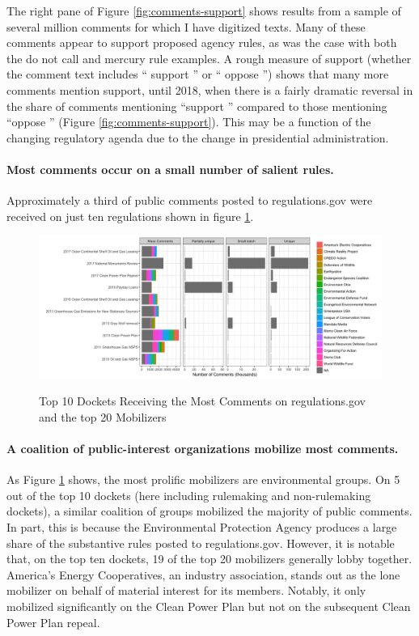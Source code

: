 The right pane of Figure \ref{fig:comments-support} shows results from a sample of several million comments for which I have digitized texts. Many of these comments appear to support proposed agency rules, as was the case with both the do not call and mercury rule examples. A rough measure of support (whether the comment text includes `` support '' or `` oppose '') shows that many more comments mention support, until 2018, when there is a fairly dramatic reversal in the share of comments mentioning ``support '' compared to those mentioning ``oppose '' (Figure \ref{fig:comments-support}). This may be a function of the changing regulatory agenda due to the change in presidential administration. 



\paragraph{Most comments occur on a small number of salient rules.} Approximately a third of public comments posted to regulations.gov were received on just ten regulations shown in figure \ref{fig:topdockets}.


\begin{figure}[h!]
    \centering
        \caption{Top 10 Dockets Receiving the Most Comments on regulations.gov and the top 20 Mobilizers}
    \includegraphics[width = 6in]{Figs/topdockets.png}
    \label{fig:topdockets}
\end{figure}


\paragraph{A coalition of public-interest organizations mobilize most comments.} As Figure \ref{fig:topdockets} %
shows, the most prolific mobilizers are environmental groups. On 5 out of the top 10 dockets (here including rulemaking and non-rulemaking dockets), a similar coalition of groups mobilized the majority of public comments. In part, this is because the Environmental Protection Agency produces a large share of the substantive rules posted to regulations.gov. However, it is notable that, on the top ten dockets, 19 of the top 20 mobilizers generally lobby together. America's Energy Cooperatives, an industry association, stands out as the lone mobilizer on behalf of material interest for its members. Notably, it only mobilized significantly on the Clean Power Plan but not on the subsequent Clean Power Plan repeal. 
